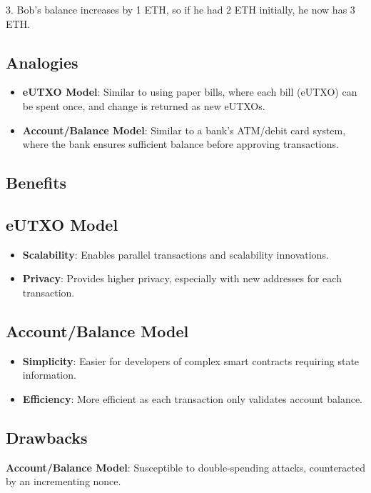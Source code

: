 3. Bob’s balance increases by 1 ETH, so if he had 2 ETH initially, he now has 3 ETH.

\subsection{Analogies}
\begin{itemize}
    \item  \textbf{eUTXO Model}: Similar to using paper bills, where each bill (eUTXO) can be spent once, and change is returned as new eUTXOs.
    \item \textbf{Account/Balance Model}: Similar to a bank's ATM/debit card system, where the bank ensures sufficient balance before approving transactions.
\end{itemize}

\subsection{Benefits}

\subsection{eUTXO Model}
\begin{itemize}
    \item \textbf{Scalability}: Enables parallel transactions and scalability innovations.
    \item \textbf{Privacy}: Provides higher privacy, especially with new addresses for each transaction.
\end{itemize}

\subsection{Account/Balance Model}
\begin{itemize}
    \item \textbf{Simplicity}: Easier for developers of complex smart contracts requiring state information.
    \item \textbf{Efficiency}: More efficient as each transaction only validates account balance.
\end{itemize}

\subsection*{Drawbacks}
\textbf{Account/Balance Model}: Susceptible to double-spending attacks, counteracted by an incrementing nonce.

